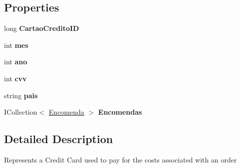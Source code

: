 \subsection*{Properties}
\begin{DoxyCompactItemize}
\item 
\mbox{\label{classmvc_j_j_m_s_1_1_models_1_1_cartao_credito_a304fc1eca4898a98c28975430cff7e20}} 
long {\bfseries Cartao\+Credito\+ID}
\item 
\mbox{\label{classmvc_j_j_m_s_1_1_models_1_1_cartao_credito_a2e757f644e2762e54d20c57aa5f48a04}} 
int {\bfseries mes}
\item 
\mbox{\label{classmvc_j_j_m_s_1_1_models_1_1_cartao_credito_ad1773cf8f0bf7c9d564f2bf74d53c228}} 
int {\bfseries ano}
\item 
\mbox{\label{classmvc_j_j_m_s_1_1_models_1_1_cartao_credito_ad30f2e84be8bd2933bb8a5181c0082f8}} 
int {\bfseries cvv}
\item 
\mbox{\label{classmvc_j_j_m_s_1_1_models_1_1_cartao_credito_ab9e08c39bd28c27e338ee6c3aa4a53f4}} 
string {\bfseries pais}
\item 
\mbox{\label{classmvc_j_j_m_s_1_1_models_1_1_cartao_credito_a9c1a277598a6e137fcb228e4803cec2e}} 
I\+Collection$<$ \mbox{\hyperlink{classmvc_j_j_m_s_1_1_models_1_1_encomenda}{Encomenda}} $>$ {\bfseries Encomendas}
\end{DoxyCompactItemize}


\subsection{Detailed Description}
Represents a Credit Card used to pay for the costs associated with an order 



